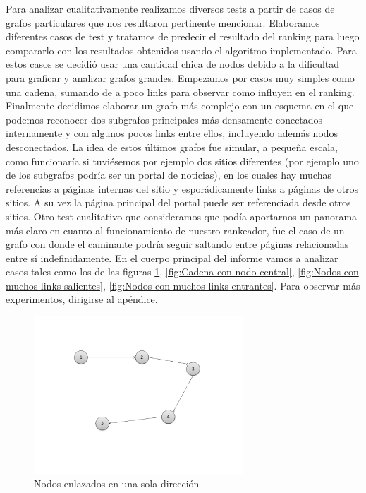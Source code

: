\par
Para analizar cualitativamente realizamos diversos tests a partir de casos de grafos particulares que nos resultaron pertinente mencionar.
Elaboramos diferentes casos de test y tratamos de predecir el resultado del ranking para luego compararlo con los resultados obtenidos usando el algoritmo implementado. Para estos casos se decidió usar una cantidad chica de nodos debido a la dificultad para graficar y analizar grafos grandes.
Empezamos por casos muy simples como una cadena, sumando de a poco links para observar como influyen en el ranking.
Finalmente decidimos elaborar un grafo m\'as complejo con un esquema en el que podemos reconocer dos subgrafos principales m\'as densamente conectados internamente y con algunos pocos links entre ellos, incluyendo además nodos desconectados. La idea de estos últimos grafos fue simular, a pequeña escala, como funcionaría si tuviésemos por ejemplo dos sitios diferentes (por ejemplo uno de los subgrafos podría ser un portal de noticias), en los cuales hay muchas referencias a p\'aginas internas del sitio y espor\'adicamente links a p\'aginas de otros sitios. A su vez la p\'agina principal del portal puede ser referenciada desde otros sitios.
Otro test cualitativo que consideramos que pod\'ia aportarnos un panorama m\'as claro en cuanto al funcionamiento de nuestro rankeador, fue el caso de un grafo con donde el caminante podr\'ia seguir saltando entre p\'aginas relacionadas entre s\'i indefinidamente.
En el cuerpo principal del informe vamos a analizar casos tales como los de las figuras \ref{fig:Cadena simple}, \ref{fig:Cadena con nodo central}, \ref{fig:Nodos con muchos links salientes}, \ref{fig:Nodos con muchos links entrantes}. Para observar m\'as experimentos, dirigirse al ap\'endice.

\begin{figure}[H]
	\centering
	\includegraphics[width=0.7\textwidth]{img/cadena4.png}
	\caption{Nodos enlazados en una sola dirección}
	\label{fig:Cadena simple}
\end{figure}



